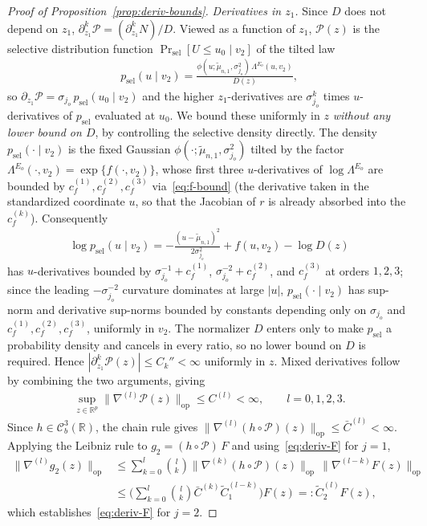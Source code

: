 \documentclass[12pt]{article}
\newcommand{\op}{\mathrm{op}}
\newcommand{\real}{\mathbb{R}}
\newcommand{\cP}{{\mathcal{P}}}
\begin{document}
\begin{appendices}
\begin{proof}[Proof of Proposition~\ref{prop:deriv-bounds}]
\medskip\noindent\emph{Derivatives in $z_1$.}
Since $D$ does not depend on $z_1$, $\partial_{z_1}^k\cP
=(\partial_{z_1}^k N)/D$. Viewed as a function of $z_1$, $\cP(z)$ is the
selective distribution function $\Pr_{\mathrm{sel}}[U\le u_0\mid v_2]$ of
the tilted law
\begin{align*}
  p_{\mathrm{sel}}(u\mid v_2)
  =\frac{\phi(u;\widetilde\mu_{n,1},\sigma_{j_o}^2)\,\Lambda^{E_o}(u,v_2)}
        {D(z)},
\end{align*}
so $\partial_{z_1}\cP=\sigma_{j_o}\,p_{\mathrm{sel}}(u_0\mid v_2)$ and the
higher $z_1$-derivatives are $\sigma_{j_o}^k$ times $u$-derivatives of
$p_{\mathrm{sel}}$ evaluated at $u_0$. We bound these uniformly in $z$
\emph{without any lower bound on $D$}, by controlling the selective
density directly. The density $p_{\mathrm{sel}}(\cdot\mid v_2)$ is the
fixed Gaussian $\phi(\cdot;\widetilde\mu_{n,1},\sigma_{j_o}^2)$ tilted by
the factor $\Lambda^{E_o}(\cdot,v_2)=\exp\{f(\cdot,v_2)\}$, whose first
three $u$-derivatives of $\log\Lambda^{E_o}$ are bounded by
$c_f^{(1)},c_f^{(2)},c_f^{(3)}$ via~\eqref{eq:f-bound} (the derivative
taken in the standardized coordinate $u$, so that the Jacobian of $r$ is
already absorbed into the $c_f^{(k)}$). Consequently
\begin{align*}
  \log p_{\mathrm{sel}}(u\mid v_2)
  =-\frac{(u-\widetilde\mu_{n,1})^2}{2\sigma_{j_o}^2}+f(u,v_2)-\log D(z)
\end{align*}
has $u$-derivatives bounded by $\sigma_{j_o}^{-1}+c_f^{(1)}$,
$\sigma_{j_o}^{-2}+c_f^{(2)}$, and $c_f^{(3)}$ at orders $1,2,3$; since
the leading $-\sigma_{j_o}^{-2}$ curvature dominates at large $|u|$,
$p_{\mathrm{sel}}(\cdot\mid v_2)$ has sup-norm and derivative sup-norms
bounded by constants depending only on $\sigma_{j_o}$ and
$c_f^{(1)},c_f^{(2)},c_f^{(3)}$, uniformly in $v_2$. The normalizer $D$
enters only to make $p_{\mathrm{sel}}$ a probability density and cancels
in every ratio, so no lower bound on $D$ is required. Hence
$|\partial_{z_1}^k\cP(z)|\le C_k''<\infty$ uniformly in $z$. Mixed
derivatives follow by combining the two arguments, giving
\begin{align}
  \label{eq:P-bound-proof}
  \sup_{z\in\real^p}\|\nabla^{(l)}\cP(z)\|_{\op}\le C^{(l)}<\infty,
  \qquad l=0,1,2,3.
\end{align}
Since $h\in\mathcal C^3_b(\real)$, the chain rule gives
$\|\nabla^{(l)}(h\circ\cP)(z)\|_{\op}\le\bar C^{(l)}<\infty$. Applying the
Leibniz rule to $g_2=(h\circ\cP)\,F$ and using~\eqref{eq:deriv-F} for
$j=1$,
\begin{align*}
  \|\nabla^{(l)}g_2(z)\|_{\op}
  &\le\sum_{k=0}^l\binom{l}{k}
     \|\nabla^{(k)}(h\circ\cP)(z)\|_{\op}\,
     \|\nabla^{(l-k)}F(z)\|_{\op}\\
  &\le\Big(\sum_{k=0}^l\binom{l}{k}\bar C^{(k)}\widetilde C_1^{(l-k)}\Big)F(z)
  =:\widetilde C_2^{(l)}F(z),
\end{align*}
which establishes~\eqref{eq:deriv-F} for $j=2$.


\end{proof}
\end{appendices}
\end{document}
